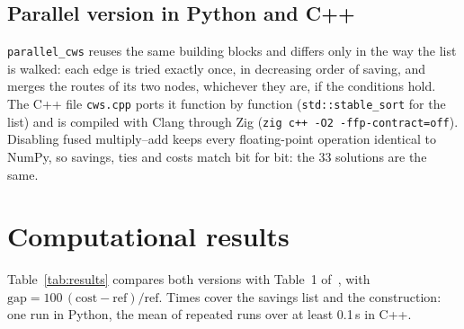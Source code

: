 \documentclass[10pt,a4paper]{article}
\begin{document}
\subsection{Parallel version in Python and C++}

\texttt{parallel\_cws} reuses the same building blocks and differs only in the way the list is walked:
each edge is tried exactly once, in decreasing order of saving, and merges the routes of its two nodes,
whichever they are, if the conditions hold. The C++ file \texttt{cws.cpp} ports it function by function
(\texttt{std::stable\_sort} for the list) and is compiled with Clang through Zig (\texttt{zig c++ -O2
-ffp-contract=off}). Disabling fused multiply--add keeps every floating-point operation identical to
NumPy, so savings, ties and costs match bit for bit: the 33 solutions are the same.

\section{Computational results}
\label{sec:res}

Table~\ref{tab:results} compares both versions with Table~1 of~\cite{juan2011}, with
$\text{gap}=100\,(\text{cost}-\text{ref})/\text{ref}$. Times cover the savings list and the construction: one run in
Python, the mean of repeated runs over at least 0.1\,s in C++.
\end{document}
